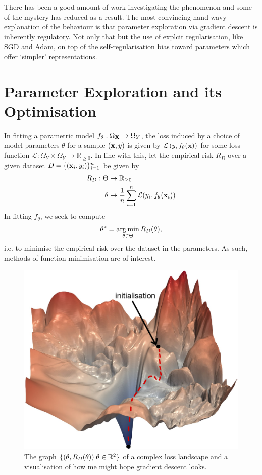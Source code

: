 \documentclass[11pt]{article}
\begin{document}
There has been a good amount of work investigating the phenomenon and some of the mystery has reduced as a result. The most convincing hand-wavy explanation of the behaviour is that parameter exploration via gradient descent is inherently regulatory. Not only that but the use of explcit regularisation, like SGD and Adam, on top of the self-regularisation bias toward parameters which offer `simpler' representations.

\section{Parameter Exploration and its Optimisation}
In fitting a parametric model $f_{\theta}:\Omega_{\mathbf{X}}\to\Omega_{Y}$, the loss induced by a choice of model parameters $\theta$ for a sample $(\mathbf{x},y)$ is given by $\mathcal{L}\left(y,f_{\theta}(\mathbf{x})\right)$ for some loss function $\mathcal{L}:\Omega_Y\times\Omega_Y\to\mathbb{R}_{\geq0}$. In line with this, let the empirical risk $R_D$ over a given dataset $D=\{(\mathbf{x}_i,y_i)\}_{i=1}^n$ be given by
\begin{align*}
    R_D:\Theta&\to\mathbb{R}_{\geq0}\\
    \theta&\mapsto\frac{1}{n}\sum_{i=1}^n\mathcal{L}(y_i,f_{\theta}(\mathbf{x}_i))
\end{align*}
In fitting $f_{\theta}$, we seek to compute
$$
\theta^{*}
=
\operatorname*{arg\,min}_{\theta\in\Theta}R_D(\theta),
$$
i.e. to minimise the empirical risk over the dataset in the parameters. As such, methods of function minimisation are of interest.

\begin{figure}[t]
    \centering
    \includegraphics[width=0.7\linewidth]{./figures/gradient_descent/loss_landscape.pdf}
    \caption{The graph $\{(\theta,R_D(\theta))|\theta\in\mathbb{R}^2\}$ of a complex loss landscape and a visualisation of how me might hope gradient descent looks.}
    \label{fig:loss_landscape_complex}
\end{figure}
\end{document}
